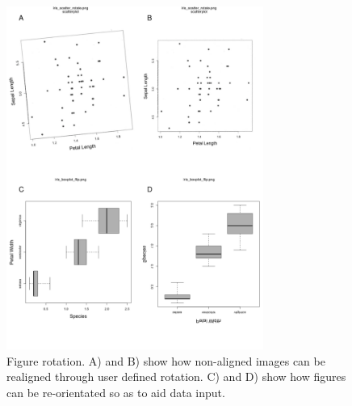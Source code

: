 \documentclass[12pt]{article}
\begin{document}
\begin{figure}[!b] 
\centering
 \includegraphics[width=0.75\textwidth]{fig_rotate.pdf} 
 \caption{Figure rotation. A) and B) show how non-aligned images can be realigned through user defined rotation. C) and D) show how figures can be re-orientated so as to aid data input.}
\label{fig:rotate}
\end{figure}
\end{document}
